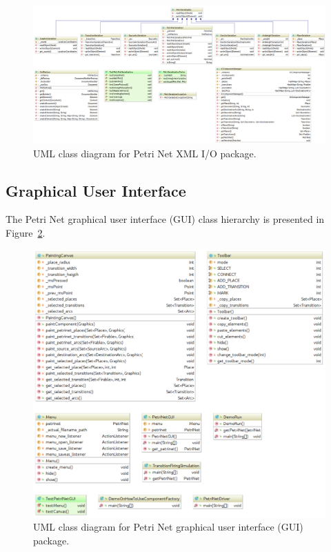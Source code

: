 \begin{figure}
	\centering
	\includegraphics[width=1.0\columnwidth]{figures/io-uml}
	\caption{UML class diagram for Petri Net XML I/O package.\label{fig:io-uml}}
\end{figure}

\subsection{Graphical User Interface}
The Petri Net graphical user interface (GUI) class hierarchy is presented in Figure~\ref{fig:ui-uml}.

\begin{figure}
	\centering
	\includegraphics[width=1.0\columnwidth]{figures/ui-uml}
	\caption{UML class diagram for Petri Net graphical user interface (GUI) package.\label{fig:ui-uml}}
\end{figure}

